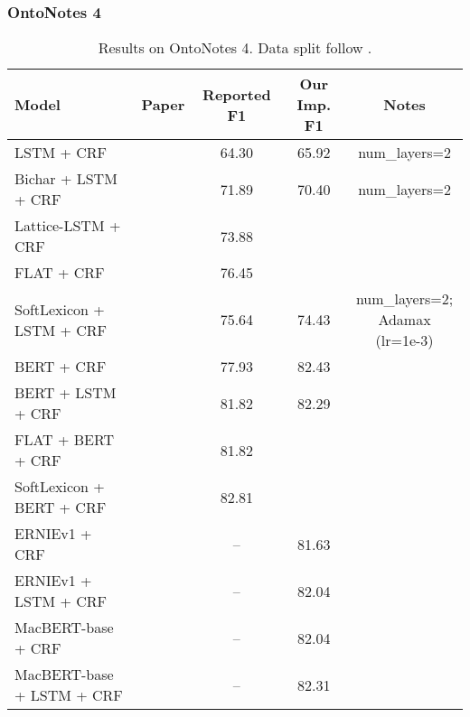 \documentclass{article}
\begin{document}
\subsubsection{OntoNotes 4}
\begin{table}[H]
    \centering
    \begin{tabular}{lcccc}
    \toprule
    Model & Paper & Reported F1 & Our Imp. F1 & Notes \\
    \midrule
    LSTM + CRF                  & \citet{zhang2018chinese} & 64.30 & 65.92 & num\_layers=2 \\
    Bichar + LSTM + CRF         & \citet{zhang2018chinese} & 71.89 & 70.40 & num\_layers=2 \\
    Lattice-LSTM + CRF          & \citet{zhang2018chinese} & 73.88 \\
    FLAT + CRF                  & \citet{li2020flat}       & 76.45 \\
    SoftLexicon + LSTM + CRF    & \citet{ma2020simplify}   & 75.64 & 74.43 & \makecell{num\_layers=2; \\Adamax (lr=1e-3)} \\
    \midrule
    BERT + CRF                  & \citet{ma2020simplify}   & 77.93 & 82.43 \\
    BERT + LSTM + CRF           & \citet{ma2020simplify}   & 81.82 & 82.29 \\
    FLAT + BERT + CRF           & \citet{li2020flat}       & 81.82 \\
    SoftLexicon + BERT + CRF    & \citet{ma2020simplify}   & 82.81 \\
    \midrule
    ERNIEv1 + CRF               & \citet{sun2019ernie}     & --    & 81.63 \\
    ERNIEv1 + LSTM + CRF        & \citet{sun2019ernie}     & --    & 82.04 \\
    \midrule
    MacBERT-base + CRF          & \citet{cui2020revisiting} & --    & 82.04 \\
    MacBERT-base + LSTM + CRF   & \citet{cui2020revisiting} & --    & 82.31 \\
    \bottomrule
    \end{tabular}
    \caption{Results on OntoNotes 4. Data split follow \citet{che2013named}.} 
\end{table}
\end{document}
